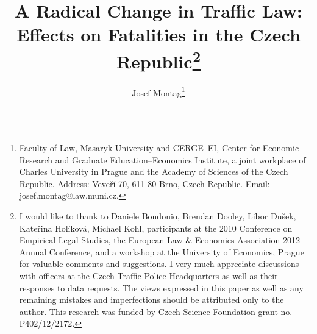 \documentclass[12pt]{article}
\begin{document}
\title{A Radical Change in Traffic Law: Effects on Fatalities in the Czech
  Republic\thanks{I would like to thank to Daniele Bondonio, Brendan Dooley,
    Libor Dušek, Kateřina Holíková, Michael Kohl, participants at the 2010
    Conference on Empirical Legal Studies, the European Law \& Economics
    Association 2012 Annual Conference, and a workshop at the University of
    Economics, Prague for valuable comments and suggestions. I very much
    appreciate discussions with officers at the Czech Traffic Police
    Headquarters as well as their responses to data requests. The views
    expressed in this paper as well as any remaining mistakes and imperfections
    should be attributed only to the author.  This research was funded by Czech
    Science Foundation grant no. P402/12/2172.
  }
}

\author{Josef Montag\thanks{Faculty of Law, Masaryk University and CERGE--EI,
    Center for Economic Research and Graduate Education--Economics Institute, a
    joint workplace of Charles University in Prague and the Academy of Sciences
    of the Czech Republic.  Address: Veveří 70, 611 80 Brno, Czech Republic.
    Email: josef.montag@law.muni.cz.
  }
}

\date{}




\maketitle
\end{document}
